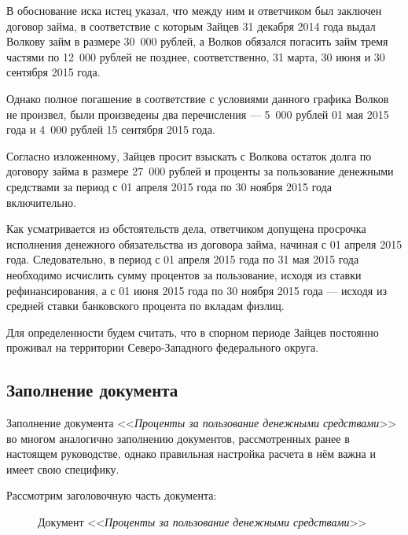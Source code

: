 \documentclass[a4paper,12pt,draft]{article}
\begin{document}
В обоснование иска истец указал, что между ним и ответчиком был заключен договор займа, в соответствие с которым Зайцев 31 декабря 2014 года выдал Волкову займ в размере 30~000 рублей, а Волков обязался погасить займ тремя частями по 12~000 рублей не позднее, соответственно, 31 марта, 30 июня и 30 сентября 2015 года.

Однако полное погашение в соответствие с условиями данного графика Волков не произвел, были произведены два перечисления --- 5~000 рублей 01 мая 2015 года и 4~000 рублей 15 сентября 2015 года.

Согласно изложенному, Зайцев просит взыскать с Волкова остаток долга по договору займа в размере 27~000 рублей и проценты за пользование денежными средствами за период с 01 апреля 2015 года по 30 ноября 2015 года включительно.

Как усматривается из обстоятельств дела, ответчиком допущена просрочка исполнения денежного обязательства из договора займа, начиная с 01 апреля 2015 года. Следовательно, в период с 01 апреля 2015 года по 31 мая 2015 года необходимо исчислить сумму процентов за пользование, исходя из ставки рефинансирования, а с 01 июня 2015 года по 30 ноября 2015 года --- исходя из средней ставки банковского процента по вкладам физлиц.

Для определенности будем считать, что в спорном периоде Зайцев постоянно проживал на территории Северо-Западного федерального округа.
\subsection{Заполнение документа}

Заполнение документа <<{\it Проценты за пользование денежными средствами}>> во многом аналогично заполнению документов, рассмотренных ранее в настоящем руководстве, однако правильная настройка расчета в нём важна и имеет свою специфику.

Рассмотрим заголовочную часть документа:
\begin{figure}[h]
\caption{Документ <<{\it Проценты за пользование денежными средствами}>>}
\label{ris:pp1}
\end{figure}
\end{document}
